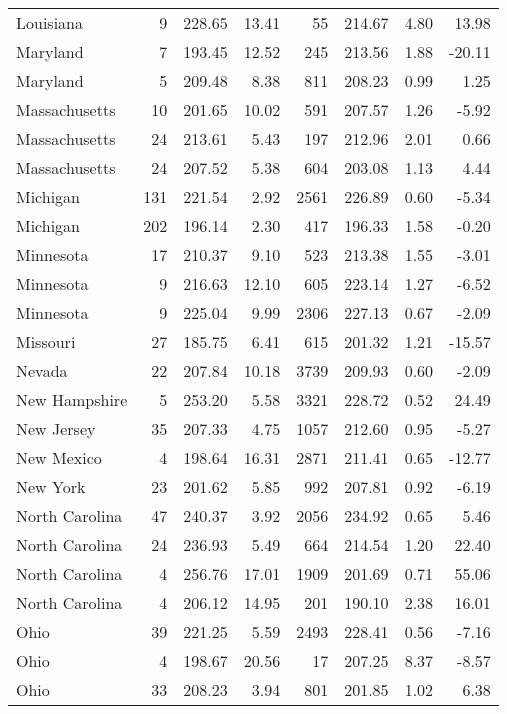 \begin{longtable}{lrrr@{\extracolsep{10pt}}rrrr}
  Louisiana &   9 & 228.65 & 13.41 &  55 & 214.67 & 4.80 & 13.98 \\ 
  Maryland &   7 & 193.45 & 12.52 & 245 & 213.56 & 1.88 & -20.11 \\ 
  Maryland &   5 & 209.48 & 8.38 & 811 & 208.23 & 0.99 & 1.25 \\ 
  Massachusetts &  10 & 201.65 & 10.02 & 591 & 207.57 & 1.26 & -5.92 \\ 
  Massachusetts &  24 & 213.61 & 5.43 & 197 & 212.96 & 2.01 & 0.66 \\ 
  Massachusetts &  24 & 207.52 & 5.38 & 604 & 203.08 & 1.13 & 4.44 \\ 
  Michigan & 131 & 221.54 & 2.92 & 2561 & 226.89 & 0.60 & -5.34 \\ 
  Michigan & 202 & 196.14 & 2.30 & 417 & 196.33 & 1.58 & -0.20 \\ 
  Minnesota &  17 & 210.37 & 9.10 & 523 & 213.38 & 1.55 & -3.01 \\ 
  Minnesota &   9 & 216.63 & 12.10 & 605 & 223.14 & 1.27 & -6.52 \\ 
  Minnesota &   9 & 225.04 & 9.99 & 2306 & 227.13 & 0.67 & -2.09 \\ 
  Missouri &  27 & 185.75 & 6.41 & 615 & 201.32 & 1.21 & -15.57 \\ 
  Nevada &  22 & 207.84 & 10.18 & 3739 & 209.93 & 0.60 & -2.09 \\ 
  New Hampshire &   5 & 253.20 & 5.58 & 3321 & 228.72 & 0.52 & 24.49 \\ 
  New Jersey &  35 & 207.33 & 4.75 & 1057 & 212.60 & 0.95 & -5.27 \\ 
  New Mexico &   4 & 198.64 & 16.31 & 2871 & 211.41 & 0.65 & -12.77 \\ 
  New York &  23 & 201.62 & 5.85 & 992 & 207.81 & 0.92 & -6.19 \\ 
  North Carolina &  47 & 240.37 & 3.92 & 2056 & 234.92 & 0.65 & 5.46 \\ 
  North Carolina &  24 & 236.93 & 5.49 & 664 & 214.54 & 1.20 & 22.40 \\ 
  North Carolina &   4 & 256.76 & 17.01 & 1909 & 201.69 & 0.71 & 55.06 \\ 
  North Carolina &   4 & 206.12 & 14.95 & 201 & 190.10 & 2.38 & 16.01 \\ 
  Ohio &  39 & 221.25 & 5.59 & 2493 & 228.41 & 0.56 & -7.16 \\ 
  Ohio &   4 & 198.67 & 20.56 &  17 & 207.25 & 8.37 & -8.57 \\ 
  Ohio &  33 & 208.23 & 3.94 & 801 & 201.85 & 1.02 & 6.38 \\ 

\end{longtable}

